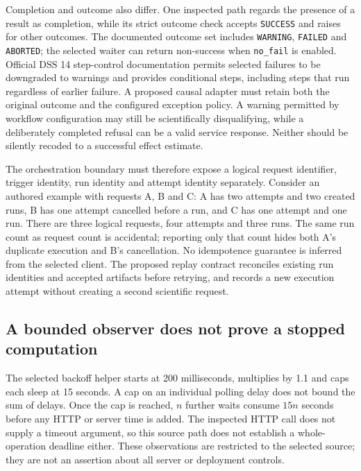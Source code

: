 Completion and outcome also differ. One inspected path regards the presence
of a result as completion, while its strict outcome check accepts
\texttt{SUCCESS} and raises for other outcomes. The documented outcome set
includes \texttt{WARNING}, \texttt{FAILED} and \texttt{ABORTED}; the selected
waiter can return non-success when \texttt{no\_fail} is enabled. Official DSS 14
step-control documentation permits selected failures to be downgraded to
warnings and provides conditional steps, including steps that run regardless
of earlier failure. A proposed causal adapter must retain both the original
outcome and the configured exception policy. A warning permitted by workflow
configuration may still be scientifically disqualifying, while a deliberately
completed refusal can be a valid service response. Neither should be silently
recoded to a successful effect estimate.\citep{exec24_workflow_contracts_dataiku,exec23_dss_dss14_flow}

The orchestration boundary must therefore expose a logical request identifier,
trigger identity, run identity and attempt identity separately. Consider an
authored example with requests A, B and C: A has two attempts and two created
runs, B has one attempt cancelled before a run, and C has one attempt and one
run. There are three logical requests, four attempts and three runs. The same
run count as request count is accidental; reporting only that count hides both
A's duplicate execution and B's cancellation. No idempotence guarantee is
inferred from the selected client. The proposed replay contract reconciles
existing run identities and accepted artifacts before retrying, and records a
new execution attempt without creating a second scientific request.\citep{exec25_dataiku_choice}

\subsection{A bounded observer does not prove a stopped computation}
The selected backoff helper starts at 200 milliseconds, multiplies by 1.1 and
caps each sleep at 15 seconds. A cap on an individual polling delay does not
bound the sum of delays. Once the cap is reached, $n$ further waits consume
$15n$ seconds before any HTTP or server time is added. The inspected HTTP call
does not supply a timeout argument, so this source path does not establish a
whole-operation deadline either. These observations are restricted to the
selected source; they are not an assertion about all server or deployment
controls.\citep{exec24_workflow_contracts_dataiku,exec25_dataiku_choice}

